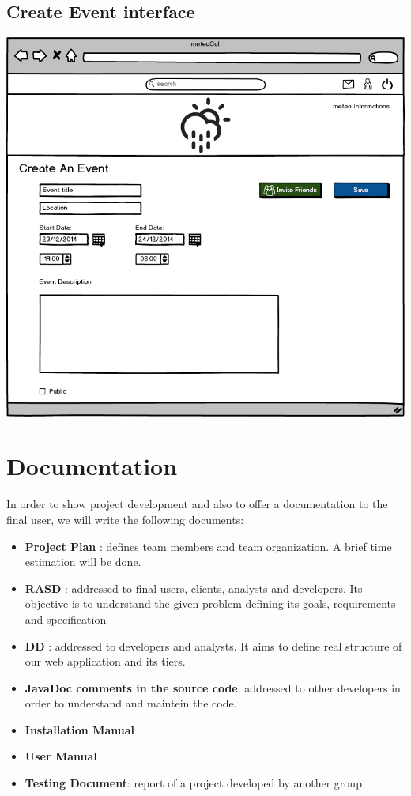 \documentclass[12pt]{book}
\begin{document}
\subsection{Create Event interface}
\begin{center}
\includegraphics[scale=0.4]{mockup_createEvent}
\end{center}

\section{Documentation}
In order to show project development and also to offer a documentation to the final user, we will write the following documents: 
\begin{itemize}
	\item \textbf{Project Plan} : defines team members and team organization. A brief time estimation will be done.
	\item \textbf{RASD} : addressed to final users, clients, analysts and developers. Its objective is to understand the given problem defining its goals, requirements and specification
	\item \textbf{DD} : addressed to developers and analysts. It aims to define real structure of our web application and its tiers. 
	\item \textbf{JavaDoc comments in the source code}: addressed to other developers in order to understand and maintein the code. 
	\item \textbf{Installation Manual }
	\item \textbf{User Manual} 
	\item \textbf{Testing Document}: report of a project developed by another group
\end{itemize}
\end{document}
